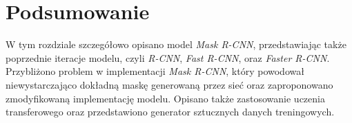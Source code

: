 \section{Podsumowanie}
W tym rozdziale szczegółowo opisano model \textit{Mask R-CNN}, przedstawiając także poprzednie iteracje modelu, czyli \textit{R-CNN}, \textit{Fast R-CNN}, oraz \textit{Faster R-CNN}.
Przybliżono problem w implementacji \textit{Mask R-CNN}, który powodował niewystarczająco dokładną maskę generowaną przez sieć oraz zaproponowano zmodyfikowaną implementację modelu.
Opisano także zastosowanie uczenia transferowego oraz przedstawiono generator sztucznych danych treningowych.
